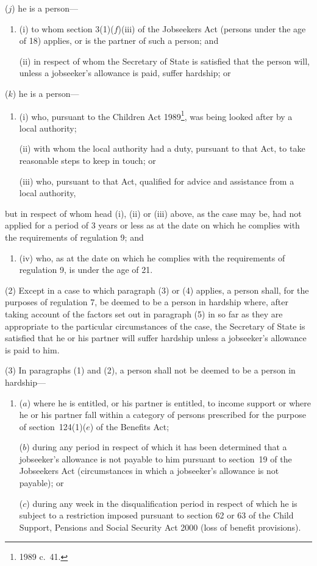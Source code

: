 \documentclass[12pt,a4paper]{article}
\begin{document}
\begin{enumerate}
($j$) he is a person—
\begin{enumerate}\item[]
(i) to whom section 3(1)($f$)(iii)  of the Jobseekers Act (persons under the age of 18) applies, or is the partner of such a person; and

(ii) in respect of whom the Secretary of State is satisfied that the person will, unless a jobseeker’s allowance is paid, suffer hardship; or
\end{enumerate}

($k$) he is a person—
\begin{enumerate}\item[]
(i) who, pursuant to the Children Act 1989\footnote{1989 c.~41.}, was being looked after by a local authority;

(ii) with whom the local authority had a duty, pursuant to that Act, to take reasonable steps to keep in touch; or

(iii) who, pursuant to that Act, qualified for advice and assistance from a local authority,
\end{enumerate}
but in respect of whom head (i), (ii)  or (iii)  above, as the case may be, had not applied for a period of 3 years or less as at the date on which he complies with the requirements of regulation 9; and
\begin{enumerate}\item[]
(iv) who, as at the date on which he complies with the requirements of regulation 9, is under the age of 21.
\end{enumerate}
\end{enumerate}

(2) Except in a case to which paragraph (3) or (4) applies, a person shall, for the purposes of regulation 7, be deemed to be a person in hardship where, after taking account of the factors set out in paragraph (5) in so far as they are appropriate to the particular circumstances of the case, the Secretary of State is satisfied that he or his partner will suffer hardship unless a jobseeker’s allowance is paid to him.

(3) In paragraphs (1) and (2), a person shall not be deemed to be a person in hardship—
\begin{enumerate}\item[]
($a$) where he is entitled, or his partner is entitled, to income support or where he or his partner fall within a category of persons prescribed for the purpose of section~124(1)($e$)  of the Benefits Act;

($b$) during any period in respect of which it has been determined that a jobseeker’s allowance is not payable to him pursuant to section~19 of the Jobseekers Act (circumstances in which a jobseeker’s allowance is not payable); or

($c$) during any week in the disqualification period in respect of which he is subject to a restriction imposed pursuant to section 62 or 63 of the Child Support, Pensions and Social Security Act 2000 (loss of benefit provisions).
\end{enumerate}
\end{document}
